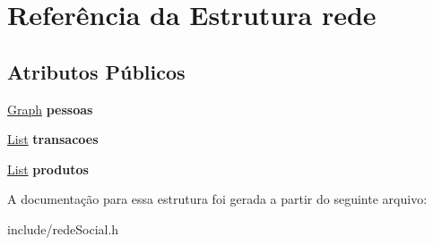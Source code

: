 \hypertarget{structrede}{}\section{Referência da Estrutura rede}
\label{structrede}
\subsection*{Atributos Públicos}
\begin{DoxyCompactItemize}
\item 
\mbox{\label{structrede_abc1e9ecb33c4dce11ba7171338bdc33a}} 
\hyperlink{structgraph}{Graph} {\bfseries pessoas}
\item 
\mbox{\label{structrede_a547b606179bc015c50f9247c850fad1f}} 
\hyperlink{structlistNode}{List} {\bfseries transacoes}
\item 
\mbox{\label{structrede_a7bab2bfc785aa45fab61d50802ab8fa3}} 
\hyperlink{structlistNode}{List} {\bfseries produtos}
\end{DoxyCompactItemize}


A documentação para essa estrutura foi gerada a partir do seguinte arquivo\+:\begin{DoxyCompactItemize}
\item 
include/rede\+Social.\+h\end{DoxyCompactItemize}
